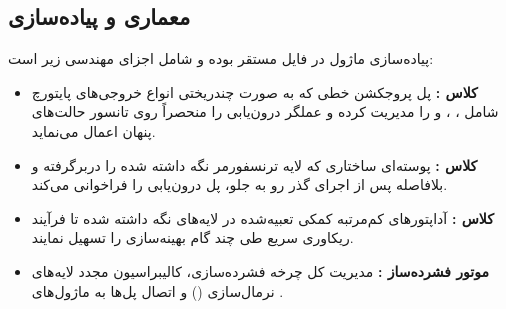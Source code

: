 \subsection{معماری و پیاده‌سازی}
پیاده‌سازی ماژول در فایل  مستقر بوده و شامل اجزای مهندسی زیر است:
\begin{itemize}
    \item \textbf{کلاس :} پل پروجکشن خطی که به صورت چندریختی انواع خروجی‌های پایتورچ شامل ، ،  و  را مدیریت کرده و عملگر درون‌یابی را منحصراً روی تانسور حالت‌های پنهان اعمال می‌نماید.
    \item \textbf{کلاس :} پوسته‌ای ساختاری که لایه ترنسفورمر نگه داشته شده را دربرگرفته و بلافاصله پس از اجرای گذر رو به جلو، پل درون‌یابی را فراخوانی می‌کند.
    \item \textbf{کلاس :} آداپتورهای کم‌مرتبه  کمکی تعبیه‌شده در لایه‌های نگه داشته شده تا فرآیند ریکاوری سریع طی چند گام بهینه‌سازی را تسهیل نمایند.
    \item \textbf{موتور فشرده‌ساز :} مدیریت کل چرخه فشرده‌سازی، کالیبراسیون مجدد لایه‌های نرمال‌سازی () و اتصال پل‌ها به ماژول‌های .
\end{itemize}
